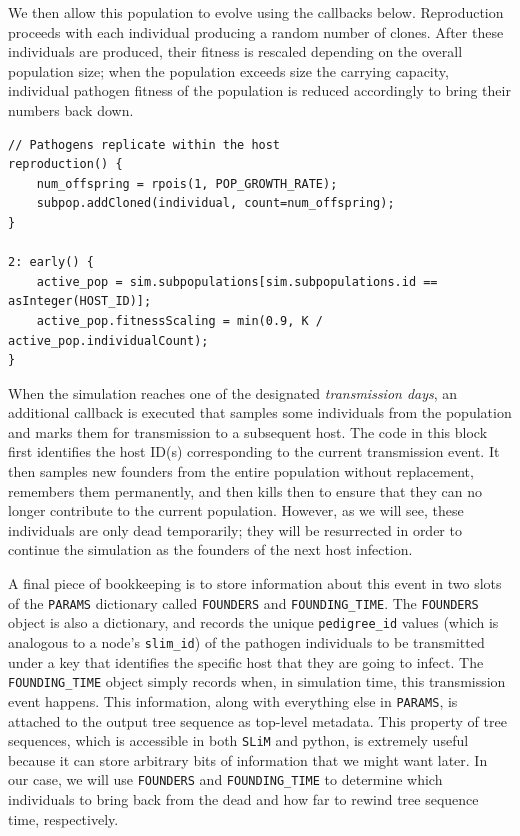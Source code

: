 \documentclass[12pt]{article}
\newcommand{\slim}[0]{\texttt{SLiM}\xspace}
\begin{document}
We then allow this population to evolve using the callbacks below. Reproduction proceeds with each individual producing a random number of clones.
After these individuals are produced, their fitness is rescaled depending on the overall population size; when
the population exceeds size the carrying capacity, individual pathogen fitness of the population is reduced accordingly to bring their numbers back down.
\begin{lstlisting}[language=slim, style=slimstyle, breaklines=true]
// Pathogens replicate within the host
reproduction() {
	num_offspring = rpois(1, POP_GROWTH_RATE);
    subpop.addCloned(individual, count=num_offspring);
}

2: early() {
	active_pop = sim.subpopulations[sim.subpopulations.id == asInteger(HOST_ID)];
	active_pop.fitnessScaling = min(0.9, K / active_pop.individualCount);
}
\end{lstlisting}

When the simulation reaches one of the designated \textit{transmission days}, an additional callback is executed that samples some individuals from the
population and marks them for transmission to a subsequent host. The code in this block first identifies the host ID(s) corresponding to the current transmission event.
It then samples new founders from the entire population without replacement, remembers them permanently, and then kills then to ensure that they can no longer
contribute to the current population. However, as we will see, these individuals are only dead temporarily; they will be resurrected in order to
continue the simulation as the founders of the next host infection.

 A final piece of bookkeeping is to store information about this event in two slots of the \verb|PARAMS| dictionary
called \verb|FOUNDERS| and \verb|FOUNDING_TIME|. The \verb|FOUNDERS| object is also a dictionary, and records the unique \verb|pedigree_id| values (which is analogous to a node's \verb|slim_id|)
of the pathogen individuals to be transmitted under a key that identifies the specific host that they are going to infect. The \verb|FOUNDING_TIME| object simply records when, in
simulation time, this transmission event happens. This information, along with everything else in \verb|PARAMS|, is attached to the output tree sequence as top-level metadata. This property
of tree sequences, which is accessible in both \slim and python, is extremely useful because it can store arbitrary bits of information that we might want later. In our case,
we will use \verb|FOUNDERS| and \verb|FOUNDING_TIME| to determine which individuals to bring back from the dead and how far to rewind tree sequence time, respectively.
\end{document}
